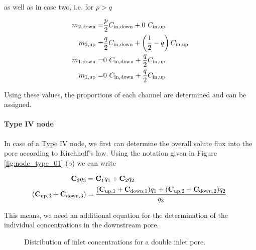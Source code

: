 \documentclass[12pt]{report}
\newcommand*{\PsTricksPath}{pstricks}
\begin{document}
as well as in case two,  i.e. for $p > q$

\begin{subequations}
\begin{align}
	m_{2,\rm{down}} = & \frac{p}{2} C_{\rm{in, down}} + 0\ C_{\rm{in, up}} \\
	m_{2,\rm{up}}   = & \frac{q}{2} C_{\rm{in, down}} + \left( \frac12 - q \right) C_{\rm{in, up}} \\
	m_{1,\rm{down}} = & 0\ C_{\rm{in, down}} + \frac{q}{2} C_{\rm{in, up}} \\
	m_{1,\rm{up}}   = & 0\ C_{\rm{in, down}} + \frac{q}{2} C_{\rm{in, up}}
\end{align}
\end{subequations}

Using these values, the proportions of each channel are determined and can be assigned.


\paragraph*{Type IV node} In case of a Type IV node, we first can determine the overall solute flux into the pore according to Kirchhoff's law. Using the notation given in Figure \ref{fig:node_type_01} (b) we can write

\begin{subequations}
\begin{align}
	{\bf C}_3 q_3 & =  {\bf C}_1 q_1 + {\bf C}_2 q_2 \\
	({\bf C}_{\rm{up,3}} + {\bf C}_{\rm{down,3}}) & =  \frac{({\bf C}_{\rm{up,1}} + {\bf C}_{\rm{down,1}}) q_1 + ({\bf C}_{\rm{up,2}} + {\bf C}_{\rm{down,2}}) q_2}{q_3}.
\end{align}
\end{subequations}

This means, we need an additional equation for the determination of the individual concentrations in the downstream pore.

\begin{figure}[ht]
	\centering
	
	\caption{Distribution of inlet concentrations for a double inlet pore.}
	\label{fig:cIn_double_inlet}
\end{figure}
\end{document}
